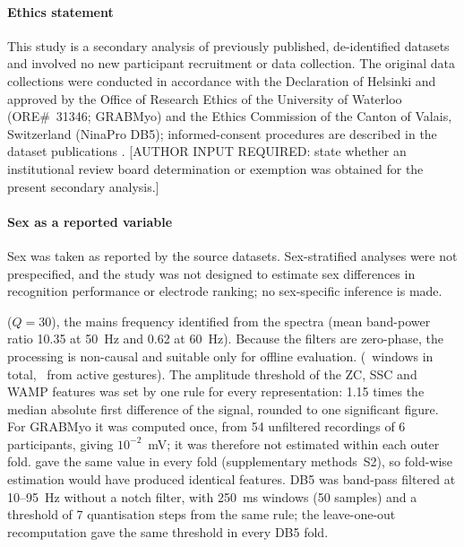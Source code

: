 \paragraph{Ethics statement} This study is a secondary analysis of previously published, de-identified datasets and involved no new participant recruitment or data collection. The original data collections were conducted in accordance with the Declaration of Helsinki and approved by the Office of Research Ethics of the University of Waterloo (ORE\#~31346; GRABMyo) and the Ethics Commission of the Canton of Valais, Switzerland (NinaPro DB5); informed-consent procedures are described in the dataset publications \citep{pradhan2022multiday,pizzolato2017comparison}. [AUTHOR INPUT REQUIRED: state whether an institutional review board determination or exemption was obtained for the present secondary analysis.]

\paragraph{Sex as a reported variable} Sex was taken as reported by the source datasets. Sex-stratified analyses were not prespecified, and the study was not designed to estimate sex differences in recognition performance or electrode ranking; no sex-specific inference is made.

 ($Q = 30$), the mains frequency identified from the spectra (mean band-power ratio 10.35 at 50~Hz and 0.62 at 60~Hz). Because the filters are zero-phase, the processing is non-causal and suitable only for offline evaluation.  (\GRABMyoWindows\ windows in total, \GRABMyoActiveWindows\ from active gestures).  The amplitude threshold of the ZC, SSC and WAMP features was set by one rule for every representation: 1.15 times the median absolute first difference of the signal, rounded to one significant figure. For GRABMyo it was computed once, from 54 unfiltered recordings of 6 participants, giving $10^{-2}$~mV; it was therefore not estimated within each outer fold.  gave the same value in every fold (supplementary methods~S2), so fold-wise estimation would have produced identical features. DB5 was band-pass filtered at 10--95~Hz without a notch filter, with 250~ms windows (50 samples) and a threshold of 7 quantisation steps from the same rule; the leave-one-out recomputation gave the same threshold in every DB5 fold.

